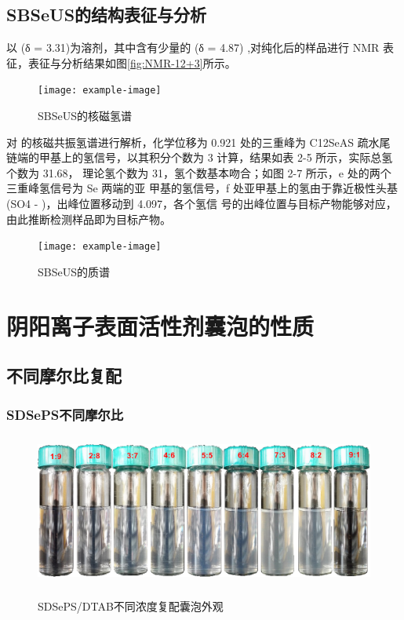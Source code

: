 \documentclass[bachelor,fandolfonts,replaceperiod]{jnuthesis}
\begin{document}
    \subsection{SBSeUS的结构表征与分析}
        以 (δ = 3.31)为溶剂，其中含有少量的 (δ = 4.87)\cite{babij2016nmr} ,对纯化后的样品进行
     NMR 表征，表征与分析结果如图\ref{fig:NMR-12+3}所示。
    \begin{figure}[htbp]
        \centering
        \texttt{[image: example-image]}\\
        \caption{SBSeUS的核磁氢谱}\label{fig:SBSeUS-nmr}
    \end{figure}
    
    对  的核磁共振氢谱进行解析，化学位移为 0.921 处的三重峰为 C12SeAS 疏水尾
    链端的甲基上的氢信号，以其积分个数为 3 计算，结果如表 2-5 所示，实际总氢个数为 31.68，
    理论氢个数为 31，氢个数基本吻合；如图 2-7 所示，e 处的两个三重峰氢信号为 Se 两端的亚
    甲基的氢信号，f 处亚甲基上的氢由于靠近极性头基(SO4 - )，出峰位置移动到 4.097，各个氢信
    号的出峰位置与目标产物能够对应，由此推断检测样品即为目标产物。
    \begin{figure}[htbp]
        \centering
        \texttt{[image: example-image]}\\
        \caption{SBSeUS的质谱}\label{fig:SBSeUS-mass}
    \end{figure}

    \section{阴阳离子表面活性剂囊泡的性质}
    \subsection{不同摩尔比复配}
    \subsubsection{SDSePS不同摩尔比}
    \begin{figure}[htbp]
        \centering
        \includegraphics[height=5cm]{figure/SDSePS-DTAB-ratio.png}\\
        \caption{SDSePS/DTAB不同浓度复配囊泡外观}\label{fig:SDSePS-DTAB-ratio}
    \end{figure}
    
\end{document}
